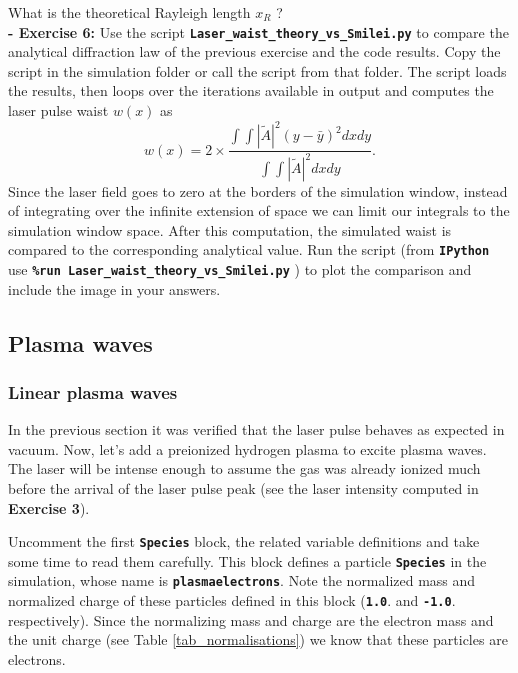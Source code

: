 \documentclass[a4paper,12pt]{extarticle}
\newcommand{\commandline}[1]{\texttt{\textbf{#1}}}
\begin{document}
What is the theoretical Rayleigh length $x_R$ ?\\

\textbf{ - Exercise  6:} Use the script \commandline{Laser\_waist\_theory\_vs\_Smilei.py} to compare the analytical diffraction law of the previous exercise and the code results. Copy the script in the simulation folder or call the script from that folder. The script loads the results, then loops over the iterations available in output and computes the laser pulse waist $w(x)$ as 
\begin{equation}
w(x)=2\times\frac{\int\int|\tilde{A}|^2  (y-\bar{y})^2 dx dy}{\int\int |\tilde{A}|^2  dx dy}.
\end{equation} Since the laser field goes to zero at the borders of the simulation window, instead of integrating over the infinite extension of space we can limit our integrals to the simulation window space. After this computation, the simulated waist is compared to the corresponding analytical value. Run the script (from \commandline{IPython} use \commandline{\%run Laser\_waist\_theory\_vs\_Smilei.py} ) to plot the comparison and include the image in your answers.

\subsection{Plasma waves}

\subsubsection{Linear plasma waves}
In the previous section it was verified that the laser pulse behaves as expected in vacuum. Now, let's add a preionized hydrogen plasma to excite plasma waves.
The laser will be intense enough to assume the gas was already ionized much before the arrival of the laser pulse peak (see the laser intensity computed in \textbf{Exercise 3}).

Uncomment the first \commandline{Species} block, the related variable definitions and take some time to read them carefully. This block defines a particle \commandline{Species} in the simulation, whose name is \commandline{plasmaelectrons}. Note the normalized mass and normalized charge of these particles defined in this block (\commandline{1.0}. and \commandline{-1.0}. respectively). Since the normalizing mass and charge are the electron mass and the unit charge (see Table \ref{tab_normalisations}) we know that these particles are electrons.
\end{document}
